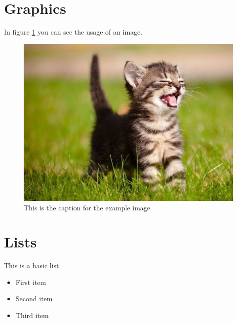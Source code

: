 \section{Graphics}
In figure \ref{example_image} you can see the usage of an image.
\begin{figure}
\includegraphics[width=\textwidth]{content/graphics/example.jpg}
\caption{This is the caption for the example image}
\label{example_image}
\end{figure}

\section{Lists}
This is a basic list
\begin{itemize}
\item First item
\item Second item
\item Third item
\end{itemize}
